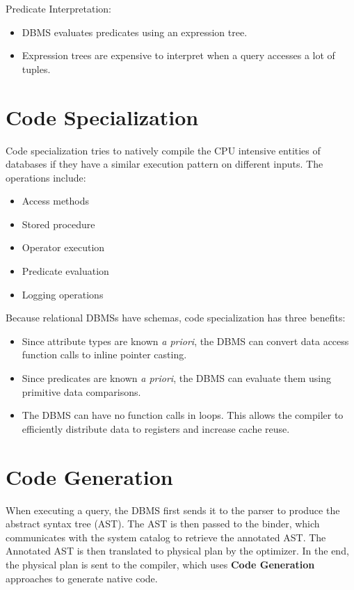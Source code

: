 \documentclass[11pt]{article}
\begin{document}
Predicate Interpretation:
\begin{itemize}
    \item
    DBMS evaluates predicates using an expression tree.
    
    \item
    Expression trees are expensive to interpret when a query accesses a lot of tuples.
\end{itemize}

\section{Code Specialization}
Code specialization tries to natively compile the CPU intensive entities of databases if they have a 
similar execution pattern on different inputs. The operations include:
\begin{itemize}
    \item Access methods
    \item Stored procedure
    \item Operator execution
    \item Predicate evaluation
    \item Logging operations
\end{itemize}
    
Because relational DBMSs have schemas, code specialization has three benefits:
\begin{itemize}
    \item
    Since attribute types are known \textit{a priori}, the DBMS can convert data access function 
    calls to inline pointer casting.
    
    \item
    Since predicates are known \textit{a priori}, the DBMS can evaluate them using primitive 
    data comparisons.
    
    \item
    The DBMS can have no function calls in loops. This allows the compiler to efficiently distribute 
    data to registers and increase cache reuse.
\end{itemize}

\section{Code Generation}
When executing a query, the DBMS first sends it to the parser to produce the abstract syntax tree  
(AST). The AST is then passed to the binder, which communicates with the system catalog to retrieve 
the annotated AST. The Annotated AST is then translated to physical plan by the optimizer. In the 
end, the physical plan is sent to the compiler, which uses \textbf{Code Generation} approaches to 
generate native code. 
\end{document}
